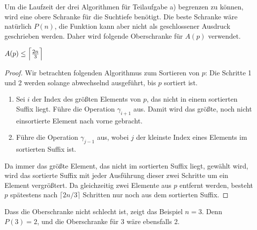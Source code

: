 \documentclass[a4paper, 10pt, ngerman]{article}
\begin{document}
Um die Laufzeit der drei Algorithmen für Teilaufgabe a) begrenzen zu können, wird eine obere Schranke für die Suchtiefe benötigt. Die beste Schranke wäre natürlich $P(n)$, die Funktion kann aber nicht als geschlossener Ausdruck geschrieben werden. Daher wird folgende Oberschranke für $A(p)$ verwendet.

\begin{lemma}
    $A(p) \le \Big{\lceil} \frac {2n} 3 \Big{\rceil}$
\end{lemma}

\begin{proof}
    Wir betrachten folgenden Algorithmus zum Sortieren von $p$: Die Schritte 1 und 2 werden solange abwechselnd ausgeführt, bis $p$ sortiert ist.
    \begin{enumerate}
        \item Sei $i$ der Index des größten Elements von $p$, das nicht in einem sortierten Suffix liegt. Führe die Operation $\gamma_{i+1}$ aus. Damit wird das größte, noch nicht einsortierte Element nach vorne gebracht.
        \item Führe die Operation $\gamma_{j-1}$ aus, wobei $j$ der kleinste Index eines Elements im sortierten Suffix ist.
    \end{enumerate}
    Da immer das größte Element, das nicht im sortierten Suffix liegt, gewählt wird, wird das sortierte Suffix mit jeder Ausführung dieser zwei Schritte um ein Element vergrößtert. Da gleichzeitig zwei Elemente aus $p$ entfernt werden, besteht $p$ spätestens nach $\lceil 2n / 3 \rceil$ Schritten nur noch aus dem sortierten Suffix.
\end{proof}

Dass die Oberschranke nicht schlecht ist, zeigt das Beispiel $n = 3$. Denn $P(3) = 2$, und die Oberschranke für 3 wäre ebensfalls 2.
\end{document}
